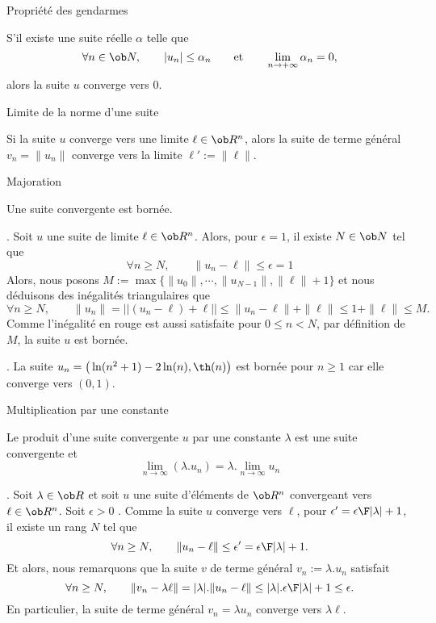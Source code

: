 \Concept [Index=Suites!Propriété des gendarmes] Propriété des gendarmes

S'il existe une suite réelle $\alpha$ telle que 
$$
\forall n\in\ob N, \qquad |u_n|\le \alpha_n\qquad \mbox{et}\qquad \lim_{n\to+\infty}\alpha_n=0, 
$$
alors la suite $u$ converge vers $0$. 


\Concept [Index=Suites!limites!limite de $\|u\|$] Limite de la norme d'une suite

Si la suite $u$ converge vers une limite $\ell\in\ob R^n$, alors la suite de terme général $v_n=\|u_n\|$ converge vers la limite $\ell':=\|\ell\|$. 


\Concept [Index=Suites!limites!majoration] Majoration

\Propriete 
Une suite convergente est bornée. 

\Demonstration. Soit $u$ une suite de limite $\ell\in\ob R^n$. Alors, pour $\epsilon=1$, il existe $N\in\ob N$ tel que 
$$
\forall n\ge N, \qquad \|u_n-\ell\|\le \epsilon=1
$$
Alors, nous posons $M:=\max\{\|u_0\|,\cdots, \|u_{N-1}\|, \|\ell\|+1\}$ et nous déduisons des inégalités triangulaires que 
$$
 \forall n\ge N , \qquad {\|u_n\|}=\big|\big|(u_n-\ell)+\ell\big|\big|\le \|u_n-\ell\|+\|\ell\|\le 1+\|\ell\|{\le M}. 
$$
Comme l'inégalité en rouge est aussi satisfaite pour $0\le n<N$, par définition de $M$, la suite $u$ est bornée. 
\CQFD

\Exemple. La suite $u_n= \big(\ln(n^2+1)-2\ln(n), \th(n)\big)$ est bornée pour $n\ge1$ car elle converge vers $(0, 1)$. 


\Concept [Index=Suites!limites!produit par un scalaire] Multiplication par une constante

Le produit d'une suite convergente $u$ par une constante $\lambda$ est une suite convergente et 
$$
\lim_{n\to\infty}(\lambda.u_n)=\lambda.\lim_{n\to\infty}u_n
$$

\Demonstration. Soit $\lambda\in\ob R$ et soit $u$ une suite d'éléments de $\ob R^n$ convergeant vers $\ell\in\ob R^n$. 
\pn
Soit $\epsilon>0$ . Comme la suite $u$ converge vers $\ell$, pour $\epsilon'={\epsilon\F|\lambda|+1}$,  il existe un
rang $N$ tel que $$ \forall n\ge N, \qquad \|u_n-\ell\|\le \epsilon'={\epsilon\F |\lambda|+1}.  $$ Et alors, nous remarquons
que la suite $v$ de terme général $v_n:=\lambda.u_n$ satisfait $$  \forall n\ge N,  \qquad  \|v_n-
\lambda\ell\|=|\lambda|.\|u_n-\ell\|\le |\lambda|.{\epsilon\F|\lambda|+1} \le\epsilon . $$ En particulier, la suite de
terme général $v_n=\lambda u_n$ converge vers $\lambda\ell$.  \CQFD

